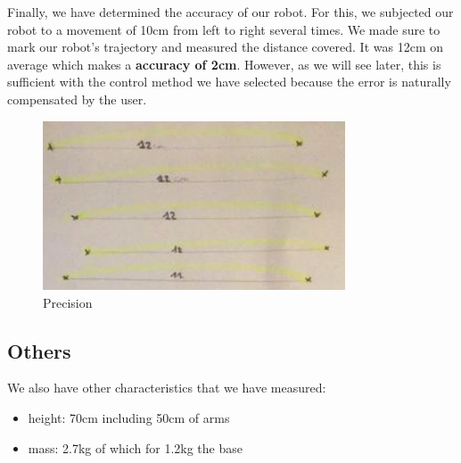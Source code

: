 Finally, we have determined the accuracy of our robot. For this, we subjected our robot to a movement of 10cm from left to right several times. We made sure to mark our robot's trajectory and measured the distance covered. It was 12cm on average which makes a \textbf{accuracy of 2cm}. However, as we will see later, this is sufficient with the control method we have selected because the error is naturally compensated by the user.
\begin{figure}[ht]
    \centering
    \includegraphics[width=0.8\textwidth]{Images/Section04/precision.png}
    \caption{Precision}
    \label{fig:Precision}
\end{figure}
\FloatBarrier

\subsection{Others}

We also have other characteristics that we have measured:
\begin{itemize}[noitemsep]
    \item height: 70cm including 50cm of arms
    \item mass: 2.7kg of which for 1.2kg the base
\end{itemize}
